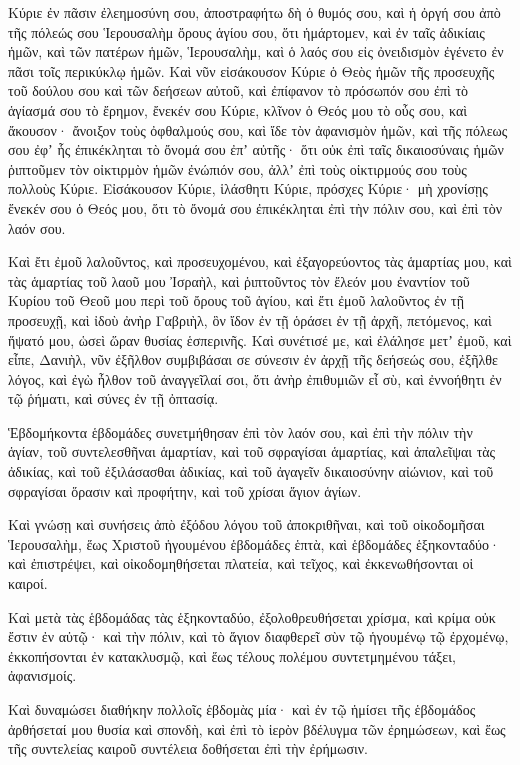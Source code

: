 {\par }{\PP {}Κύριε ἐν πᾶσιν ἐλεημοσύνη σου, ἀποστραφήτω δὴ ὁ θυμός σου, καὶ ἡ ὀργή σου ἀπὸ τῆς πόλεώς σου Ἱερουσαλὴμ ὄρους ἁγίου σου, ὅτι ἡμάρτομεν, καὶ ἐν ταῖς ἀδικίαις ἡμῶν, καὶ τῶν πατέρων ἡμῶν, Ἱερουσαλὴμ, καὶ ὁ λαός σου εἰς ὀνειδισμὸν ἐγένετο ἐν πᾶσι τοῖς περικύκλῳ ἡμῶν.
Καὶ νῦν εἰσάκουσον Κύριε ὁ Θεὸς ἡμῶν τῆς προσευχῆς τοῦ δούλου σου καὶ τῶν δεήσεων αὐτοῦ, καὶ ἐπίφανον τὸ πρόσωπόν σου ἐπὶ τὸ ἁγίασμά σου τὸ ἔρημον, ἔνεκέν σου Κύριε,
κλῖνον ὁ Θεός μου τὸ οὖς σου, καὶ ἄκουσον· ἄνοιξον τοὺς ὀφθαλμούς σου, καὶ ἴδε τὸν ἀφανισμὸν ἡμῶν, καὶ τῆς πόλεως σου ἐφʼ ἧς ἐπικέκληται τὸ ὄνομά σου ἐπʼ αὐτῆς· ὅτι οὐκ ἐπὶ ταῖς δικαιοσύναις ἡμῶν ῥιπτοῦμεν τὸν οἰκτιρμὸν ἡμῶν ἐνώπιόν σου, ἀλλʼ ἐπὶ τοὺς οἰκτιρμούς σου τοὺς πολλοὺς Κύριε.
Εἰσάκουσον Κύριε, ἱλάσθητι Κύριε, πρόσχες Κύριε· μὴ χρονίσῃς ἕνεκέν σου ὁ Θεός μου, ὅτι τὸ ὄνομά σου ἐπικέκληται ἐπὶ τὴν πόλιν σου, καὶ ἐπὶ τὸν λαόν σου.
\par }{\PP {}Καὶ ἔτι ἐμοῦ λαλοῦντος, καὶ προσευχομένου, καὶ ἐξαγορεύοντος τὰς ἁμαρτίας μου, καὶ τὰς ἁμαρτίας τοῦ λαοῦ μου Ἰσραὴλ, καὶ ῥιπτοῦντος τὸν ἔλεόν μου ἐναντίον τοῦ Κυρίου τοῦ Θεοῦ μου περὶ τοῦ ὄρους τοῦ ἁγίου,
καὶ ἔτι ἐμοῦ λαλοῦντος ἐν τῇ προσευχῇ, καὶ ἰδοὺ ἀνὴρ Γαβριὴλ, ὃν ἴδον ἐν τῇ ὁράσει ἐν τῇ ἀρχῆ, πετόμενος, καὶ ἥψατό μου, ὡσεὶ ὥραν θυσίας ἑσπερινῆς.
Καὶ συνέτισέ με, καὶ ἐλάλησε μετʼ ἐμοῦ, καὶ εἶπε, Δανιὴλ, νῦν ἐξῆλθον συμβιβάσαι σε σύνεσιν
ἐν ἀρχῇ τῆς δεήσεώς σου, ἐξῆλθε λόγος, καὶ ἐγὼ ἦλθον τοῦ ἀναγγεῖλαί σοι, ὅτι ἀνὴρ ἐπιθυμιῶν εἶ σὺ, καὶ ἐννοήθητι ἐν τῷ ῥήματι, καὶ σύνες ἐν τῇ ὀπτασίᾳ.
\par }{\PP {}Ἑβδομήκοντα ἑβδομάδες συνετμήθησαν ἐπὶ τὸν λαόν σου, καὶ ἐπὶ τὴν πόλιν τὴν ἁγίαν, τοῦ συντελεσθῆναι ἁμαρτίαν, καὶ τοῦ σφραγίσαι ἁμαρτίας, καὶ ἀπαλεῖψαι τὰς ἀδικίας, καὶ τοῦ ἐξιλάσασθαι ἀδικίας, καὶ τοῦ ἀγαγεῖν δικαιοσύνην αἰώνιον, καὶ τοῦ σφραγίσαι ὅρασιν καὶ προφήτην, καὶ τοῦ χρίσαι ἅγιον ἁγίων.
\par }{\PP {}Καὶ γνώσῃ καὶ συνήσεις ἀπὸ ἐξόδου λόγου τοῦ ἀποκριθῆναι, καὶ τοῦ οἰκοδομῆσαι Ἱερουσαλὴμ, ἕως Χριστοῦ ἡγουμένου ἑβδομάδες ἑπτὰ, καὶ ἑβδομάδες ἑξηκονταδύο· καὶ ἐπιστρέψει, καὶ οἰκοδομηθήσεται πλατεία, καὶ τεῖχος, καὶ ἐκκενωθήσονται οἱ καιροί.
\par }{\PP {}Καὶ μετὰ τὰς ἑβδομάδας τὰς ἑξηκονταδύο, ἐξολοθρευθήσεται χρίσμα, καὶ κρίμα οὐκ ἔστιν ἐν αὐτῷ· καὶ τὴν πόλιν, καὶ τὸ ἅγιον διαφθερεῖ σὺν τῷ ἡγουμένῳ τῷ ἐρχομένῳ, ἐκκοπήσονται ἐν κατακλυσμῷ, καὶ ἕως τέλους πολέμου συντετμημένου τάξει, ἀφανισμοίς.
\par }{\PP {}Καὶ δυναμώσει διαθήκην πολλοῖς ἑβδομὰς μία· καὶ ἐν τῷ ἡμίσει τῆς ἑβδομάδος ἀρθήσεταί μου θυσία καὶ σπονδὴ, καὶ ἐπὶ τὸ ἱερὸν βδέλυγμα τῶν ἐρημώσεων, καὶ ἕως τῆς συντελείας καιροῦ συντέλεια δοθήσεται ἐπὶ τὴν ἐρήμωσιν.

}
